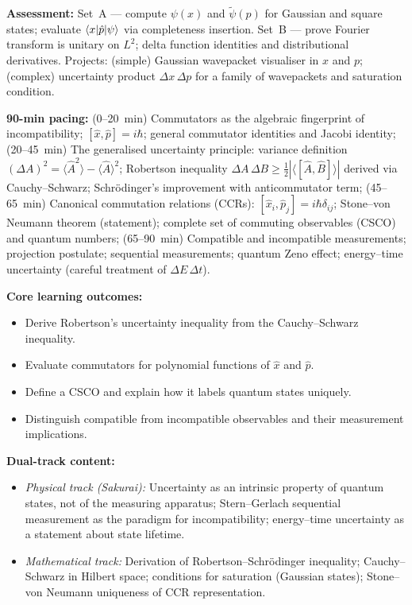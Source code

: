 \documentclass[11pt,a4paper]{article}
\begin{document}
\begin{tcolorbox}[modulebox, title={Module~I.3 / L02: Bases: Discrete and Continuous}]
\medskip\textbf{Assessment:}
Set~A --- compute $\psi(x)$ and $\tilde{\psi}(p)$ for Gaussian and square states;
evaluate $\braket{x|\hat{p}|\psi}$ via completeness insertion.
Set~B --- prove Fourier transform is unitary on $L^2$; delta function identities and
distributional derivatives.
Projects: (simple) Gaussian wavepacket visualiser in $x$ and $p$; (complex) uncertainty
product $\Delta x\,\Delta p$ for a family of wavepackets and saturation condition.
\end{tcolorbox}

\begin{tcolorbox}[modulebox, title={Module~I.3 / L03: Uncertainty and Commutation Relations}]
\textbf{90-min pacing:} (0--20~min) Commutators as the algebraic fingerprint of incompatibility;
$[\hat{x},\hat{p}]=i\hbar$; general commutator identities and Jacobi identity;
(20--45~min) The generalised uncertainty principle: variance definition
$(\Delta A)^2=\langle\hat{A}^2\rangle-\langle\hat{A}\rangle^2$;
Robertson inequality $\Delta A\,\Delta B\geq\tfrac{1}{2}|\langle[\hat{A},\hat{B}]\rangle|$
derived via Cauchy--Schwarz; Schr\"odinger's improvement with anticommutator term;
(45--65~min) Canonical commutation relations (CCRs):
$[\hat{x}_i,\hat{p}_j]=i\hbar\delta_{ij}$; Stone--von Neumann theorem (statement);
complete set of commuting observables (CSCO) and quantum numbers;
(65--90~min) Compatible and incompatible measurements; projection postulate;
sequential measurements; quantum Zeno effect; energy--time uncertainty
(careful treatment of $\Delta E\,\Delta t$).

\medskip\textbf{Core learning outcomes:}
\begin{itemize}[leftmargin=1.4em,topsep=2pt,itemsep=1pt]
  \item Derive Robertson's uncertainty inequality from the Cauchy--Schwarz inequality.
  \item Evaluate commutators for polynomial functions of $\hat{x}$ and $\hat{p}$.
  \item Define a CSCO and explain how it labels quantum states uniquely.
  \item Distinguish compatible from incompatible observables and their measurement implications.
\end{itemize}

\medskip\textbf{Dual-track content:}
\begin{itemize}[leftmargin=1.4em,topsep=2pt,itemsep=1pt]
  \item \textit{Physical track (Sakurai):} Uncertainty as an intrinsic property of
    quantum states, not of the measuring apparatus; Stern--Gerlach sequential
    measurement as the paradigm for incompatibility; energy--time uncertainty as
    a statement about state lifetime.
  \item \textit{Mathematical track:} Derivation of Robertson--Schr\"odinger inequality;
    Cauchy--Schwarz in Hilbert space; conditions for saturation (Gaussian states);
    Stone--von Neumann uniqueness of CCR representation.
\end{itemize}


\end{tcolorbox}
\end{document}
